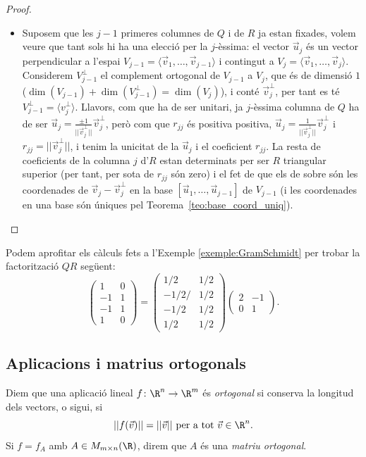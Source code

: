 \begin{proof}
\begin{itemize}
    \item Suposem que les $j-1$ primeres columnes de $Q$ i de $R$ ja estan fixades, volem veure que tant sols hi ha una elecció per la $j$-èssima: el vector $\vec u_j$ és un vector perpendicular a l'espai $V_{j-1}=\langle \vec v_1, \dots, \vec v_{j-1}\rangle$ i contingut a $V_j=\langle \vec v_1, \dots, \vec v_j\rangle$. Considerem $V_{j-1}^\perp$ el complement ortogonal de $V_{j-1}$ a $V_j$, que és de dimensió $1$ ($\dim(V_{j-1})+\dim(V_{j-1}^\perp)=\dim(V_j)$), i conté $\vec v_j^\perp$, per tant es té $V_{j-1}^\perp=\langle v_j^\perp \rangle$. Llavors, com que ha de ser unitari, ja $j$-èssima columna de $Q$ ha de ser $\vec u_j=\frac{\pm1}{||\vec v_j^\perp||}\vec v_j^\perp$, però com que $r_{jj}$ és positiva positiva, $\vec u_j=\frac{1}{||\vec v_j^\perp||}\vec v_j^\perp$ i $r_{jj}=||\vec v_j^\perp||$, i tenim la unicitat de la $\vec u_j$ i el coeficient $r_{jj}$. La resta de coeficients de la columna $j$ d'$R$ estan determinats per ser $R$ triangular superior (per tant, per sota de $r_{jj}$ són zero) i el fet de que els de sobre són les coordenades de $\vec v_j-\vec v_j^\perp$ en la base $[\vec u_1,\dots,\vec u_{j-1}]$ de $V_{j-1}$ (i les coordenades en una base són úniques pel Teorema~\ref{teo:base_coord_uniq}).
\end{itemize}
\end{proof}
\begin{exemple}
Podem aprofitar els càlculs fets a l'Exemple \ref{exemple:GramSchmidt} per trobar la factorització $QR$ següent:
\[
\begin{pmatrix}
1 & 0 \\ -1 & 1 \\ -1 & 1 \\ 1 & 0
\end{pmatrix}=
\begin{pmatrix}
1/2 & 1/2 \\ -1/2/ & 1/2 \\ -1/2 & 1/2 \\ 1/2 & 1/2
\end{pmatrix}
\begin{pmatrix}
2 & -1 \\ 0 & 1
\end{pmatrix}.
\]
\end{exemple}

\subsection{Aplicacions i matrius ortogonals}
\begin{definicio}
Diem que una aplicació lineal $f \colon \R^n\to \R^m$ és \emph{ortogonal} si conserva la longitud dels vectors, o sigui, si
\[
||f(\vec v)||=||\vec v|| \text{ per a tot $\vec v\in\R^n$.}
\]
Si $f=f_A$ amb $A\in M_{m\times n}(\R)$, direm que $A$ és una \emph{matriu ortogonal}.
\end{definicio}

